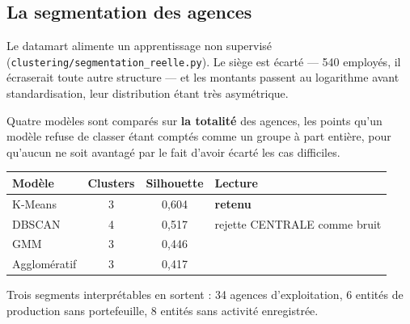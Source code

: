 \subsection{La segmentation des agences}

Le datamart alimente un apprentissage non supervisé
(\texttt{clustering/segmentation\_reelle.py}). Le siège est écarté --- 540
employés, il écraserait toute autre structure --- et les montants passent au
logarithme avant standardisation, leur distribution étant très asymétrique.

Quatre modèles sont comparés sur \textbf{la totalité} des agences, les points
qu'un modèle refuse de classer étant comptés comme un groupe à part entière,
pour qu'aucun ne soit avantagé par le fait d'avoir écarté les cas difficiles.

\noindent\begin{tabularx}{\textwidth}{|L{3.6cm}|c|c|X|}
\hline
\textbf{Modèle} & \textbf{Clusters} & \textbf{Silhouette} & \textbf{Lecture}\\
\hline
K-Means & 3 & 0,604 & \textbf{retenu}\\
\hline
DBSCAN & 4 & 0,517 & rejette CENTRALE comme bruit\\
\hline
GMM & 3 & 0,446 & \\
\hline
Agglomératif & 3 & 0,417 & \\
\hline
\end{tabularx}

\vspace{0.5em}
Trois segments interprétables en sortent : 34 agences d'exploitation,
6 entités de production sans portefeuille, 8 entités sans activité
enregistrée.
